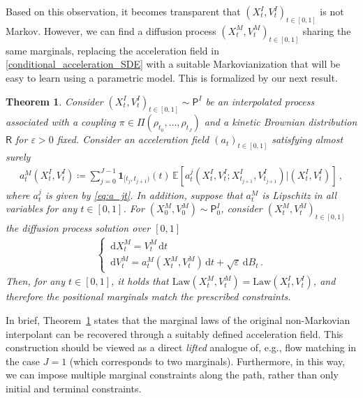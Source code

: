 \documentclass[12pt]{article}
\theoremstyle{plain}
\theoremstyle{plain}
\newtheorem{thm}{Theorem}
\theoremstyle{remark}
\newcommand{\bbE}{\mathbb{E}}
\newcommand{\dd}{\,\mathrm{d}}
\newcommand*{\defeq}{\coloneqq}
\newcommand{\msf}[1]{\mathsf{#1}}
\newcommand{\eps}{\varepsilon}
\newcommand{\ccint}[1]{\left[#1\right]}
\newcommand{\1}{\bm{1}}
\theoremstyle{plain}
\theoremstyle{definition}
\theoremstyle{remark}
\begin{document}
Based on this observation, it becomes transparent that $(X_t^I,V_t^I)_{t\in\ccint{0,1}}$ is not Markov. However, we can find a diffusion process $(X_t^{M},V_{t}^M)_{t \in \ccint{0,1}}$ sharing the same marginals, replacing the acceleration field in \eqref{conditional_acceleration_SDE} with a suitable Markovianization that will be easy to learn using a parametric model. This is formalized by our next result.
\begin{thm}\label{thm:main}
  Consider $(X_t^I,V_t^I)_{t\in\ccint{0,1}} \sim \msf P^I$ be an interpolated process associated with a coupling $\pi \in \Pi(\rho_{t_0},\ldots,\rho_{t_J})$ and a kinetic Brownian distribution $\msf R$ for $\eps >0$ fixed.
Consider an acceleration field $(a_t)_{t\in\ccint{0,1}}$ satisfying almost surely
\begin{align*}
    a_t^{M}(X_{t}^I,V_t^I) \defeq \sum_{j=0}^{J-1} \bm{1}_{[t_j,t_{j+1})}(t) \, \bbE[a_t^j(X_t^I,V_t^I;X_{t_{j+1}}^I,V_{t_{j+1}}^I)|(X_t^I,V_t^I)]\,,
\end{align*}
where $a_t^j$ is given by \eqref{eq:a_jt}.  {In addition, suppose that $a_t^M$ is Lipschitz in all variables for any $t\in\ccint{0,1}$}. For $(X_0^M,V_0^M) \sim \mathsf P^I_0$, consider $(X_t^M,V_t^M)_{t\in\ccint{0,1}}$ the diffusion process solution over $ [0,1]$
\begin{align*}
    \begin{cases}
    \dd X_t^M = V_t^M \dd t \\
    \dd V_t^M = a_t^{M}(X_t^M,V_t^M)\dd t + \sqrt{\eps}\dd B_t\,.
    \end{cases}
\end{align*}
Then, for any $t \in [0,1]$, it holds that $\mathrm{Law}(X_t^M,V_t^M)=\mathrm{Law}(X_t^I,V_t^I)$, and therefore the positional marginals match the prescribed constraints.
\end{thm}
In brief, Theorem~\ref{thm:main} states that the marginal laws of the original non-Markovian interpolant can be recovered through a suitably defined acceleration field. This construction should be viewed as a direct \emph{lifted} analogue of, e.g., flow matching \citep{albergo2022building,lipman2022flow,liu2022flow} in the case $J=1$ (which corresponds to two marginals). Furthermore, in this way, we can impose multiple marginal constraints along the path, rather than only initial and terminal constraints.
\end{document}
